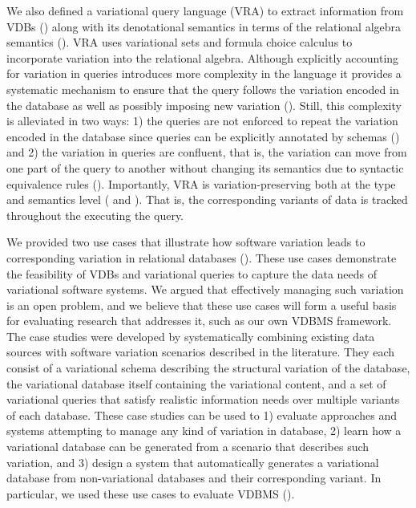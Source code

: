 We also defined a variational query language (VRA) to extract information from VDBs
() along with its denotational semantics in terms of the relational algebra 
semantics (). 
%
VRA uses variational sets and formula choice calculus to incorporate
variation into the relational algebra. Although explicitly accounting for variation
in queries introduces more complexity in the language it provides a systematic
mechanism to ensure that the query follows the variation encoded in the database
as well as possibly imposing new variation (). Still, this complexity
is alleviated in two ways: 1) the queries are not enforced to repeat the variation encoded in the 
database since queries can be explicitly annotated by schemas ()
and 2) the variation in queries are confluent, that is, the variation can move from one 
part of the query to another without changing its semantics due to syntactic equivalence
rules (). 
%
Importantly, VRA is variation-preserving both at the type and semantics level
( and ). 
That is, the corresponding variants of data is tracked throughout the executing 
the query.

We provided two use cases that illustrate how software variation leads to
corresponding variation in relational databases (). 
These use cases demonstrate
the feasibility of VDBs and variational queries to capture the data needs of variational
software systems.
%
We argued that effectively managing such variation is an open problem, and we
believe that these use cases will form a useful basis for evaluating
research that addresses it, such as our own VDBMS framework.
%
The case studies were developed by systematically combining existing data
sources with software variation scenarios described in the literature. They
each consist of a variational schema describing the structural variation of
the database, the variational database itself containing the variational
content, and a set of variational queries that satisfy realistic information
needs over multiple variants of each database.
% 
These case studies can be used to 1) evaluate approaches and systems
 attempting to manage any kind of variation in database, 2) learn how a
 variational database can be generated from a scenario that describes such
 variation, and 3) design a system that automatically generates a variational
 database from non-variational databases and their corresponding variant. In
 particular, we used these use cases to evaluate VDBMS (). 


